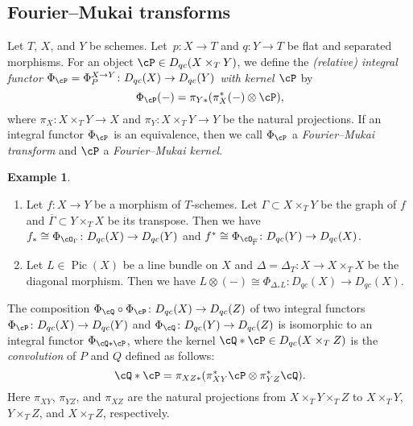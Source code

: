 \documentclass[12pt]{amsart}
\numberwithin{equation}{section}
\theoremstyle{plain}
\theoremstyle{definition}
\newtheorem{example}[theorem]{Example}
\DeclareMathOperator{\Pic}{\mathrm{Pic}}
\begin{document}
\subsection{Fourier--Mukai transforms}\label{subsection:fourier-mukai-transforms}
Let $T$, $X$, and $Y$ be schemes.
Let\ $p \colon X \to T$ and $q \colon Y \to T$ be flat and separated morphisms.
For an object $\cP \in D_{qc}(X \times_T Y)$, we define the \emph{(relative) integral functor $\Phi_{\cP} = \Phi^{X \to Y}_P \colon D_{qc}(X) \to D_{qc}(Y)$ with kernel $\cP$} by
\begin{equation}
    \Phi_{\cP}(-) = \pi_{Y*}(\pi_{X}^*(-) \otimes \cP),
\end{equation}
where $\pi_X \colon X \times_T Y \to X$ and $\pi_Y \colon X \times_T Y \to Y$ be the natural projections.
If an integral functor $\Phi_{\cP}$ is an equivalence, then we call $\Phi_{\cP}$ a \emph{Fourier--Mukai transform} and $\cP$ a \emph{Fourier--Mukai kernel}.

\begin{example}
    \begin{enumerate}
        \item Let $f \colon X \to Y$ be a morphism of $T$-schemes. Let $\Gamma \subset X \times_T Y$ be the graph of $f$ and $\overline{\Gamma} \subset Y \times_T X$ be its transpose. Then we have $f_* \cong \Phi_{\cO_{\Gamma}} \colon D_{qc}(X) \to D_{qc}(Y)$ and $f^* \cong \Phi_{\cO_{\overline{\Gamma}}} \colon D_{qc}(Y) \to D_{qc}(X)$.
        \item Let $L \in \Pic(X)$ be a line bundle on $X$ and $\Delta = \Delta_T \colon X \to X \times_T X$ be the diagonal morphism. Then we have $L \otimes (-) \cong \Phi_{\Delta_*L} \colon D_{qc}(X) \to D_{qc}(X)$.
    \end{enumerate}
\end{example}

The composition $\Phi_{\cQ} \circ \Phi_{\cP} \colon D_{qc}(X) \to D_{qc}(Z)$ of two integral functors $\Phi_{\cP} \colon D_{qc}(X) \to D_{qc}(Y)$ and $\Phi_{\cQ} \colon D_{qc}(Y) \to D_{qc}(Z)$  is isomorphic to an integral functor $\Phi_{\cQ * \cP}$, where the kernel $\cQ * \cP \in D_{qc}(X \times_T Z)$ is the \emph{convolution} of $P$ and $Q$ defined as follows:
\begin{equation}
    \cQ * \cP = \pi_{XZ*}(\pi_{XY}^*\cP \otimes \pi_{YZ}^*\cQ).
\end{equation}
Here $\pi_{XY}$, $\pi_{YZ}$, and $\pi_{XZ}$ are the natural projections from $X \times_T Y \times_T Z$ to $X \times_T Y$, $Y \times_T Z$, and $X \times_T Z$, respectively.
\end{document}
